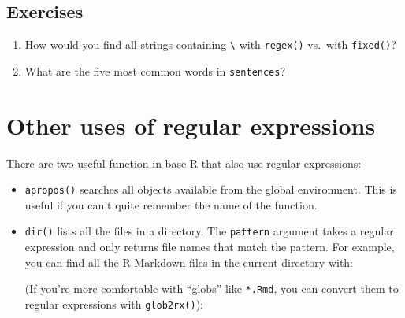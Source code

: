 \documentclass[]{book}
\newenvironment{Shaded}{\begin{snugshade}}{\end{snugshade}}
\newcommand{\KeywordTok}[1]{\textcolor[rgb]{0.13,0.29,0.53}{\textbf{{#1}}}}
\newcommand{\DataTypeTok}[1]{\textcolor[rgb]{0.13,0.29,0.53}{{#1}}}
\newcommand{\CharTok}[1]{\textcolor[rgb]{0.31,0.60,0.02}{{#1}}}
\newcommand{\StringTok}[1]{\textcolor[rgb]{0.31,0.60,0.02}{{#1}}}
\newcommand{\CommentTok}[1]{\textcolor[rgb]{0.56,0.35,0.01}{\textit{{#1}}}}
\newcommand{\NormalTok}[1]{{#1}}
\begin{document}
\subsection{Exercises}\label{exercises-41}

\begin{enumerate}
\def\labelenumi{\arabic{enumi}.}
\item
  How would you find all strings containing \texttt{\textbackslash{}}
  with \texttt{regex()} vs.~with \texttt{fixed()}?
\item
  What are the five most common words in \texttt{sentences}?
\end{enumerate}

\section{Other uses of regular
expressions}\label{other-uses-of-regular-expressions}

There are two useful function in base R that also use regular
expressions:

\begin{itemize}
\item
  \texttt{apropos()} searches all objects available from the global
  environment. This is useful if you can't quite remember the name of
  the function.

\begin{Shaded}
\end{Shaded}
\item
  \texttt{dir()} lists all the files in a directory. The
  \texttt{pattern} argument takes a regular expression and only returns
  file names that match the pattern. For example, you can find all the R
  Markdown files in the current directory with:

\begin{Shaded}
\end{Shaded}

  (If you're more comfortable with ``globs'' like \texttt{*.Rmd}, you
  can convert them to regular expressions with \texttt{glob2rx()}):
\end{itemize}
\end{document}
